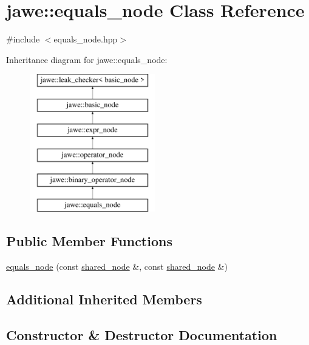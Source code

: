 \hypertarget{classjawe_1_1equals__node}{}\section{jawe\+:\+:equals\+\_\+node Class Reference}
\label{classjawe_1_1equals__node}


{\ttfamily \#include $<$equals\+\_\+node.\+hpp$>$}

Inheritance diagram for jawe\+:\+:equals\+\_\+node\+:\begin{figure}[H]
\begin{center}
\leavevmode
\includegraphics[height=6.000000cm]{classjawe_1_1equals__node}
\end{center}
\end{figure}
\subsection*{Public Member Functions}
\begin{DoxyCompactItemize}
\item 
\hyperlink{classjawe_1_1equals__node_a991c13e39ea1bdf2553fb26d0bf8fa3b}{equals\+\_\+node} (const \hyperlink{namespacejawe_a3f307481d921b6cbb50cc8511fc2b544}{shared\+\_\+node} \&, const \hyperlink{namespacejawe_a3f307481d921b6cbb50cc8511fc2b544}{shared\+\_\+node} \&)
\end{DoxyCompactItemize}
\subsection*{Additional Inherited Members}


\subsection{Constructor \& Destructor Documentation}
\mbox{\label{classjawe_1_1equals__node_a991c13e39ea1bdf2553fb26d0bf8fa3b}} 

